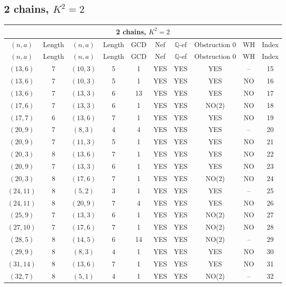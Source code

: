 \subsection{2 chains, $K^2 = 2$}
\begin{longtable}{|c|c|c|c|c|c|c|c|c|c|}
\hline
\multicolumn{10}{|c|}{2 chains, $K^2 = 2$}\\
\hline
$(n,a)$ & Length & $(n,a)$ & Length & GCD & Nef & $\mathbb Q$-ef & Obstruction 0 & WH & Index\\
\hline
\endfirsthead

\hline
$(n,a)$ & Length & $(n,a)$ & Length & GCD & Nef & $\mathbb Q$-ef & Obstruction 0 & WH & Index\\
\hline
\endhead
\hline
\endfoot

$(13, 6)$ & 7 & $(10, 3)$ & 5 & 1 & YES & YES & YES & -- & 15\\
$(13, 6)$ & 7 & $(10, 3)$ & 5 & 1 & YES & YES & YES & NO & 16\\
$(13, 6)$ & 7 & $(13, 3)$ & 6 & 13 & YES & YES & YES & NO & 17\\
$(17, 6)$ & 7 & $(13, 3)$ & 6 & 1 & YES & YES & NO(2) & NO & 18\\
$(17, 7)$ & 6 & $(13, 6)$ & 7 & 1 & YES & YES & YES & NO & 19\\
$(20, 9)$ & 7 & $(8, 3)$ & 4 & 4 & YES & YES & YES & -- & 20\\
$(20, 9)$ & 7 & $(11, 3)$ & 5 & 1 & YES & YES & YES & NO & 21\\
$(20, 3)$ & 8 & $(13, 6)$ & 7 & 1 & YES & YES & YES & NO & 22\\
$(20, 9)$ & 7 & $(13, 3)$ & 6 & 1 & YES & YES & YES & NO & 23\\
$(20, 3)$ & 8 & $(17, 6)$ & 7 & 1 & YES & YES & NO(2) & NO & 24\\
$(24, 11)$ & 8 & $(5, 2)$ & 3 & 1 & YES & YES & YES & -- & 25\\
$(24, 11)$ & 8 & $(20, 9)$ & 7 & 4 & YES & YES & YES & NO & 26\\
$(25, 9)$ & 7 & $(13, 3)$ & 6 & 1 & YES & YES & NO(2) & NO & 27\\
$(27, 10)$ & 7 & $(17, 6)$ & 7 & 1 & YES & YES & NO(2) & NO & 28\\
$(28, 5)$ & 8 & $(14, 5)$ & 6 & 14 & YES & YES & NO(2) & -- & 29\\
$(29, 9)$ & 8 & $(8, 3)$ & 4 & 1 & YES & YES & YES & NO & 30\\
$(31, 14)$ & 8 & $(13, 6)$ & 7 & 1 & YES & YES & YES & NO & 31\\
$(32, 7)$ & 8 & $(5, 1)$ & 4 & 1 & YES & YES & NO(2) & -- & 32\\

\end{longtable}

